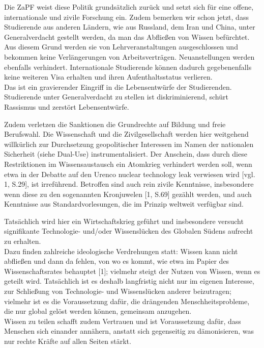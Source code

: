 \documentclass[DIV=calc]{scrartcl}
\let\oldgrqq=\grqq
\def\grqq{\oldgrqq\xspace}
\begin{document}
Die ZaPF weist diese Politik grundsätzlich zurück und setzt sich für eine offene, internationale und zivile Forschung ein. Zudem bemerken wir schon jetzt, dass Studierende aus anderen Ländern, wie aus Russland, dem Iran und China, unter Generalverdacht gestellt werden, da man das \glqq Abfließen\grqq{} von Wissen befürchtet. Aus diesem Grund werden sie von Lehrveranstaltungen ausgeschlossen und bekommen keine Verlängerungen von Arbeitsverträgen. Neuanstellungen werden ebenfalls verhindert. Internationale Studierende können dadurch gegebenenfalls keine weiteren Visa erhalten und ihren Aufenthaltsstatus verlieren. \\
Das ist ein gravierender Eingriff in die Lebensentwürfe der Studierenden. Studierende unter Generalverdacht zu stellen ist diskriminierend, schürt Rassismus und zerstört Lebensentwürfe. 

Zudem verletzen die Sanktionen die Grundrechte auf Bildung und freie Berufswahl. Die Wissenschaft und die Zivilgesellschaft werden hier weitgehend willkürlich zur Durchsetzung geopolitischer Interessen im Namen der nationalen Sicherheit (siehe Dual-Use) instrumentalisiert. Der Anschein, dass durch diese Restriktionen im Wissensaustausch ein Atomkrieg verhindert werden soll, wenn etwa in der Debatte auf den Urenco nuclear technology leak verwiesen wird [vgl. 1, S.29], ist irreführend. Betroffen sind auch rein zivile Kenntnisse, insbesondere wenn diese zu den sogenannten \glqq Kronjuwelen\grqq{} [1, S.69] gezählt werden, und auch Kenntnisse aus Standardvorlesungen, die im Prinzip weltweit verfügbar sind. 

Tatsächlich wird hier ein Wirtschaftskrieg geführt und insbesondere versucht \glqq signifikante Technologie- und/oder Wissenslücken\grqq{} des Globalen Südens aufrecht zu erhalten.\\ Dazu finden zahlreiche ideologische Verdrehungen statt: Wissen kann nicht \glqq abfließen\grqq und dann da fehlen, von wo es kommt, wie etwa im Papier des Wissenschaftsrates behauptet [1];
vielmehr steigt der Nutzen von Wissen, wenn es geteilt wird. Tatsächlich ist es deshalb langfristig nicht nur im eigenen Interesse, zur Schließung von Technologie- und Wissenslücken anderer beizutragen; vielmehr ist es die Voraussetzung dafür, die drängenden Menschheitsprobleme, die nur global gelöst werden können, gemeinsam anzugehen. \\
Wissen zu teilen schafft zudem Vertrauen und ist Voraussetzung dafür, dass Menschen sich einander annähern, anstatt sich gegenseitig zu dämonisieren, was nur rechte Kräfte auf allen Seiten stärkt. 
\end{document}
